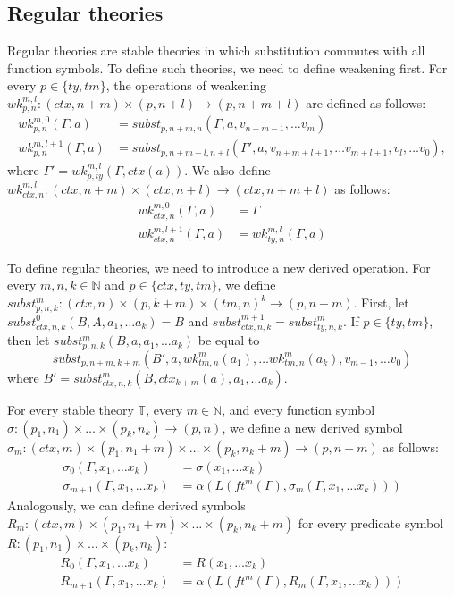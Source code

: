 \documentclass[reqno]{amsart}
\theoremstyle{definition}
\theoremstyle{remark}
\numberwithin{figure}{section}
\begin{document}
\subsection{Regular theories}

Regular theories are stable theories in which substitution commutes with all function symbols.
To define such theories, we need to define weakening first.
For every $p \in \{ty,tm\}$, the operations of weakening $wk^{m,l}_{p,n} : (ctx,n+m) \times (p,n+l) \to (p,n+m+l)$ are defined as follows:
\begin{align*}
wk^{m,0}_{p,n}(\Gamma,a) & = subst_{p,n+m,n}(\Gamma, a, v_{n+m-1}, \ldots v_m) \\
wk^{m,l+1}_{p,n}(\Gamma,a) & = subst_{p,n+m+l,n+l}(\Gamma', a, v_{n+m+l+1}, \ldots v_{m+l+1}, v_l, \ldots v_0),
\end{align*}
where $\Gamma' = wk^{m,l}_{p,ty}(\Gamma,ctx(a))$.
We also define $wk^{m,l}_{ctx,n} : (ctx,n+m) \times (ctx,n+l) \to (ctx,n+m+l)$ as follows:
\begin{align*}
wk^{m,0}_{ctx,n}(\Gamma,a) & = \Gamma \\
wk^{m,l+1}_{ctx,n}(\Gamma,a) & = wk^{m,l}_{ty,n}(\Gamma,a)
\end{align*}

To define regular theories, we need to introduce a new derived operation.
For every $m,n,k \in \mathbb{N}$ and $p \in \{ ctx, ty, tm \}$, we define $subst^m_{p,n,k} : (ctx,n) \times (p,k+m) \times (tm,n)^k \to (p,n+m)$.
First, let $subst^0_{ctx,n,k}(B, A, a_1, \ldots a_k) = B$ and $subst^{m+1}_{ctx,n,k} = subst^m_{ty,n,k}$.
If $p \in \{ ty, tm \}$, then let $subst^m_{p,n,k}(B, a, a_1, \ldots a_k)$ be equal to
\[ subst_{p,n+m,k+m}(B', a, wk^m_{tm,n}(a_1), \ldots wk^m_{tm,n}(a_k), v_{m-1}, \ldots v_0) \]
where $B' = subst^m_{ctx,n,k}(B, ctx_{k+m}(a), a_1, \ldots a_k)$.

For every stable theory $\mathbb{T}$, every $m \in \mathbb{N}$, and every function symbol $\sigma : (p_1,n_1) \times \ldots \times (p_k,n_k) \to (p,n)$,
we define a new derived symbol $\sigma_m : (ctx,m) \times (p_1,n_1+m) \times \ldots \times (p_k,n_k+m) \to (p,n+m)$ as follows:
\begin{align*}
\sigma_0(\Gamma, x_1, \ldots x_k) & = \sigma(x_1, \ldots x_k) \\
\sigma_{m+1}(\Gamma, x_1, \ldots x_k) & = \alpha(L(ft^m(\Gamma), \sigma_m(\Gamma, x_1, \ldots x_k)))
\end{align*}
Analogously, we can define derived symbols $R_m : (ctx,m) \times (p_1,n_1+m) \times \ldots \times (p_k,n_k+m)$ for every predicate symbol $R : (p_1,n_1) \times \ldots \times (p_k,n_k)$:
\begin{align*}
R_0(\Gamma, x_1, \ldots x_k) & = R(x_1, \ldots x_k) \\
R_{m+1}(\Gamma, x_1, \ldots x_k) & = \alpha(L(ft^m(\Gamma), R_m(\Gamma, x_1, \ldots x_k)))
\end{align*}
\end{document}

